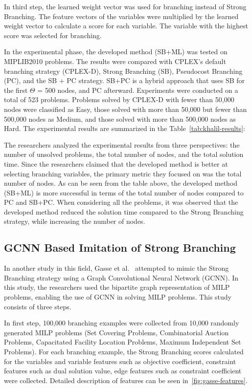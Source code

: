 In third step, the learned weight vector was used for branching instead of Strong Branching.
The feature vectors of the variables were multiplied by the learned weight vector to calculate a score for each variable.
The variable with the highest score was selected for branching.


In the experimental phase, the developed method (SB+ML) was tested on MIPLIB2010 problems.
The results were compared with CPLEX's default branching strategy (CPLEX-D), Strong Branching (SB), Pseudocost Branching (PC), and the SB + PC strategy. SB+PC is a hybrid approach that uses SB for the first $\Theta$ = 500 nodes, and PC afterward.
Experiments were conducted on a total of 523 problems.
Problems solved by CPLEX-D with fewer than 50,000 nodes were classified as Easy, those solved with more than 50,000 but fewer than 500,000 nodes as Medium, and those solved with more than 500,000 nodes as Hard.
The experimental results are summarized in the Table~\ref{tab:khalil-results}:




The researchers analyzed the experimental results from three perspectives: the number of unsolved problems, the total number of nodes, and the total solution time.
Since the researchers claimed that the developed method is better at selecting branching variables, the primary metric they focused on was the total number of nodes.
As can be seen from the table above, the developed method (SB+ML) is more successful in terms of the total number of nodes compared to PC and SB+PC.
When considering all the problems, it was observed that the developed method reduced the solution time compared to the Strong Branching strategy, while increasing the number of nodes.


\subsection{GCNN Based Imitation of Strong Branching}\label{subsec:gcnn-based-imitation-of-strong-branching}
In another study in this field, Gasse et al.~\cite{gasseExactCombinatorialOptimization2019} attempted to mimic the Strong Branching strategy using a Graph Convolutional Neural Network (GCNN).
In this study, the researchers used the bipartite graph representation of MILP problems, enabling the use of GCNN in solving MILP problems.
This study consists of three steps.


In first step, 100,000 branching examples were collected from 10,000 randomly generated MILP problems (Set Covering Problems, Combinatorial Auction Problems, Capacitated Facility Location Problems, Maximum Independent Set Problems).
For each branching example, the Strong Branching scores calculated for the variables and variable features such as objective coefficient, constraint features such as dual solution value, edge features such as constraint coefficient were collected.
Detailed description of features can be seen in~\ref{fig:gasse-features}. %


